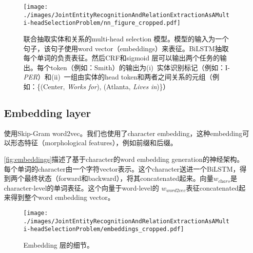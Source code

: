 \documentclass[a4paper,UTF8,no-math,zihao=-4]{ctexart}
\newcommand{\eg}{e.g., }
\newcommand{\ie}{i.e., }
\begin{document}
	\begin{figure}%
		\texttt{[image: ./images/JointEntityRecognitionAndRelationExtractionAsAMulti-headSelectionProblem/nn\_figure\_cropped.pdf]}
		\caption{联合抽取实体和关系的multi-head selection 模型。模型的输入为一个句子，该句子使用word vector（embeddings）来表征。BiLSTM抽取每个单词的负责表征。然后CRF和sigmoid 层可以输出两个任务的输出。每个token（例如：Smith）的输出为(i)~实体识别标记（例如：I-\emph{PER}）和(ii)~一组由实体的head token和两者之间关系的元组（例如：\{(Center, \emph{Works for}), (Atlanta, \emph{Lives in})\}）
%			
		}
		\label{fig:model}
	\end{figure}
	
	
	\subsection{Embedding layer}
	
	使用Skip-Gram word2vec。我们也使用了character embedding，这种embedding可以形态特征（morphological features），例如前缀和后缀。
	
	\autoref{fig:embeddings}描述了基于character的word embedding generation的神经架构。每个单词的character由一个字符vector表示。这个character送进一个BiLSTM，得到两个最终状态（forward和backward），将其concatenated起来。向量$w_\textit{chars}$是character-level的单词表征。这个向量于word-level的  $w_\textit{word2vec}$表征concatenated起来得到整个word embedding vector。
	
	\begin{figure}
		\centering				
		\texttt{[image: ./images/JointEntityRecognitionAndRelationExtractionAsAMulti-headSelectionProblem/embeddings\_cropped.pdf]}
		\caption{Embedding 层的细节。}
		\label{fig:embeddings}
	\end{figure}
	
\end{document}
